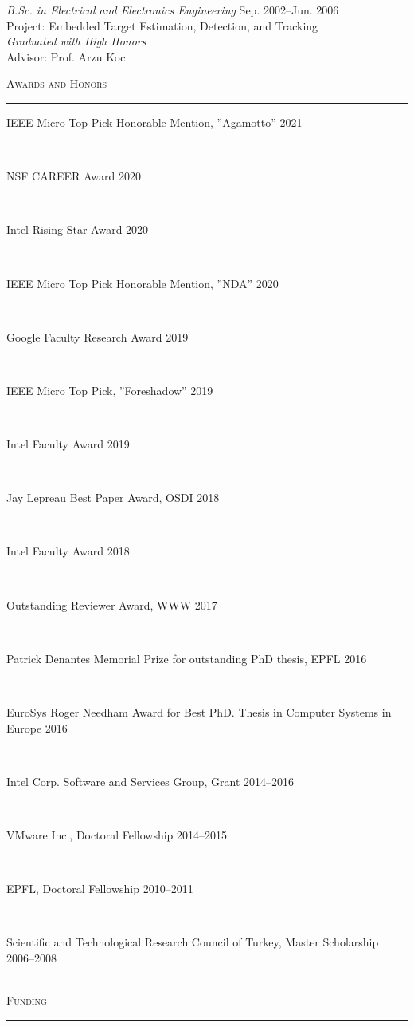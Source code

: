 \documentclass[10pt]{article}
\newcommand{\mysec}[1]{\vspace{2em}\textsc{\large #1}\vspace{1mm}\hrule\vspace{2mm}}
\newcommand{\myssub}[1]{\hspace*{2mm}\parbox{163mm}{#1}\vspace*{2mm}}
\begin{document}
\myssub{\textit{B.Sc. in Electrical and Electronics Engineering} \hfill Sep. 2002--Jun. 2006 \\
Project: Embedded Target Estimation, Detection, and Tracking\\
{\textit{Graduated with High Honors}} \\
Advisor: Prof. Arzu Koc}
\newpage
\mysec{Awards and Honors}
\myssub{IEEE Micro Top Pick Honorable Mention, ''Agamotto'' \hfill 2021} \\
\myssub{NSF CAREER Award \hfill 2020} \\
\myssub{Intel Rising Star Award \hfill 2020} \\
\myssub{IEEE Micro Top Pick Honorable Mention, ''NDA'' \hfill 2020} \\
\myssub{Google Faculty Research Award \hfill 2019} \\
\myssub{IEEE Micro Top Pick, ''Foreshadow'' \hfill 2019} \\
\myssub{Intel Faculty Award \hfill 2019} \\
\myssub{Jay Lepreau Best Paper Award, OSDI \hfill 2018} \\
\myssub{Intel Faculty Award \hfill 2018} \\
\myssub{Outstanding Reviewer Award, WWW \hfill 2017} \\
\myssub{Patrick Denantes Memorial Prize for outstanding PhD thesis, EPFL \hfill 2016} \\
\myssub{EuroSys Roger Needham Award for Best PhD. Thesis in Computer Systems in Europe \hfill 2016} \\
\myssub{Intel Corp. Software and Services Group, Grant \hfill 2014--2016} \\
\myssub{VMware Inc., Doctoral Fellowship \hfill 2014--2015} \\
\myssub{EPFL, Doctoral Fellowship \hfill 2010--2011} \\
\myssub{Scientific and Technological Research Council of Turkey, Master Scholarship \hfill 2006--2008} \\


\mysec{Funding}
\end{document}
